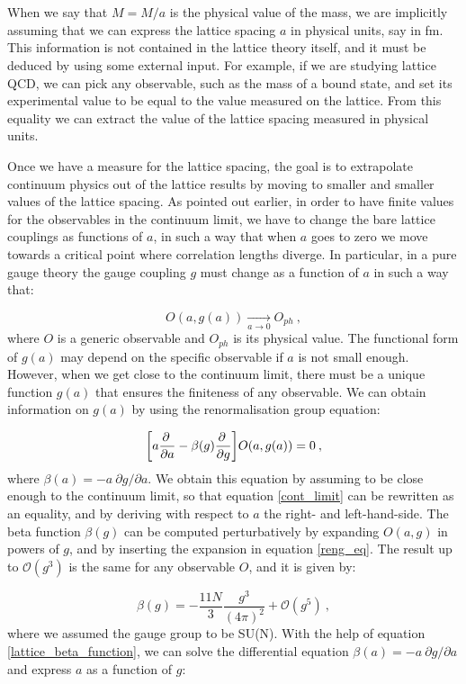 When we say that $M = \hat M /a$ is the physical value of the mass, we are implicitly assuming that we can express the lattice spacing $a$ in physical units, say in fm. This information is not contained in the lattice theory itself, and it must be deduced by using some external input. For example, if we are studying lattice QCD, we can pick any observable, such as the mass of a bound state, and set its experimental value to be equal to the value measured on the lattice. From this equality we can extract the value of the lattice spacing measured in physical units. 

Once we have a measure for the lattice spacing, the goal is to extrapolate continuum physics out of the lattice results by moving to smaller and smaller values of the lattice spacing. As pointed out earlier, in order to have finite values for the observables in the continuum limit, we have to change the bare lattice couplings as functions of $a$, in such a way that when $a$ goes to zero we move towards a critical point where correlation lengths diverge. In particular, in a pure gauge theory the gauge coupling $g$ must change as a function of $a$ in such a way that:

\begin{equation}
O(a,g(a)) \underset{a \to 0}{\longrightarrow} O_{ph} \: ,
\label{cont_limit}
\end{equation}
%
where $O$ is a generic observable and $O_{ph}$ is its physical value. The functional form of $g(a)$ may depend on the specific observable if $a$ is not small enough. However, when we get close to the continuum limit, there must be a unique function $g(a)$ that ensures the finiteness of any observable. We can obtain information on $g(a)$ by using the renormalisation group equation:

\begin{equation}
\biggl[ a\frac{\partial \:}{\partial a} - \beta(g) \frac{\partial \:}{\partial g} \biggr] O(a,g(a)) = 0 \: ,
\label{reng_eq}
\end{equation}
%
where $\beta(a) = - a \: \partial g/ \partial a$. We obtain this equation by assuming to be close enough to the continuum limit, so that equation \ref{cont_limit} can be rewritten as an equality, and by deriving with respect to $a$ the right- and left-hand-side. The beta function $\beta(g)$ can be computed perturbatively by expanding $O(a,g)$ in powers of $g$, and by inserting the expansion in equation \ref{reng_eq}. The result up to $\mathcal O(g^3)$ is the same for any observable $O$, and it is given by:

\begin{equation}
 \beta(g) = - \frac{11 N}{3} \frac{g^3}{(4 \pi)^2} + \mathcal O (g^5) \: ,
\label{lattice_beta_function}
\end{equation}
%
where we assumed the gauge group to be SU(N). With the help of equation \ref{lattice_beta_function}, we can solve the differential equation $\beta(a) = - a \: \partial g/ \partial a$ and express $a$ as a function of $g$:


